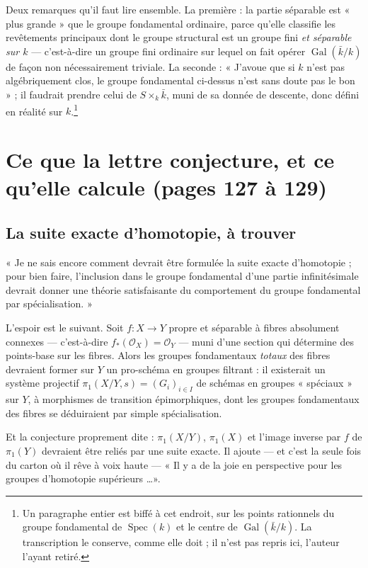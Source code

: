 \documentclass[11pt,a4paper]{article}
\begin{document}
Deux remarques qu'il faut lire ensemble. La première : la partie séparable est
« plus grande » que le groupe fondamental ordinaire, parce qu'elle classifie
les revêtements principaux dont le groupe structural est un groupe fini
\emph{et séparable sur $k$} --- c'est-à-dire un groupe fini ordinaire sur
lequel on fait opérer $\operatorname{Gal}(\bar{k}/k)$ de façon non
nécessairement triviale. La seconde : « J'avoue que si $k$ n'est pas
algébriquement clos, le groupe fondamental ci-dessus n'est sans doute pas le
bon » ; il faudrait prendre celui de $S \times_{k} \bar{k}$, muni de sa donnée
de descente, donc défini en réalité sur $k$.\footnote{Un paragraphe entier est
biffé à cet endroit, sur les points rationnels du groupe fondamental de
$\operatorname{Spec}(k)$ et le centre de $\operatorname{Gal}(\bar{k}/k)$. La
transcription le conserve, comme elle doit ; il n'est pas repris ici, l'auteur
l'ayant retiré.}

\section*{Ce que la lettre conjecture, et ce qu'elle calcule (pages 127 à 129)}

\subsection*{La suite exacte d'homotopie, à trouver}

« Je ne sais encore comment devrait être formulée la suite exacte d'homotopie ;
pour bien faire, l'inclusion dans le groupe fondamental d'une partie
infinitésimale devrait donner une théorie satisfaisante du comportement du
groupe fondamental par spécialisation. »

L'espoir est le suivant. Soit $f : X \to Y$ propre et séparable à fibres
absolument connexes --- c'est-à-dire $f_{*}(\mathcal{O}_{X}) = \mathcal{O}_{Y}$
--- muni d'une section qui détermine des points-base sur les fibres. Alors les
groupes fondamentaux \emph{totaux} des fibres devraient former sur $Y$ un
pro-schéma en groupes filtrant : il existerait un système projectif
$\pi_{1}(X/Y, s) = (G_{i})_{i \in I}$ de schémas en groupes « spéciaux » sur
$Y$, à morphismes de transition épimorphiques, dont les groupes fondamentaux
des fibres se déduiraient par simple spécialisation.

Et la conjecture proprement dite : $\pi_{1}(X/Y)$, $\pi_{1}(X)$ et l'image
inverse par $f$ de $\pi_{1}(Y)$ devraient être reliés par une suite exacte.
Il ajoute --- et c'est la seule fois du carton où il rêve à voix haute ---
« Il y a de la joie en perspective pour les groupes d'homotopie supérieurs
\dots ».
\end{document}
